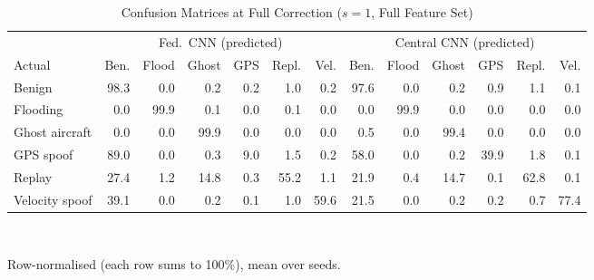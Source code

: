\begin{table}[t]
\centering
\scriptsize
\caption{Confusion Matrices at Full Correction ($s=1$, Full Feature Set)}
\label{tab:confusion}
\setlength{\tabcolsep}{2.5pt}
\begin{tabular}{lrrrrrrrrrrrr}
\toprule
& \multicolumn{6}{c}{Fed.\ CNN (predicted)} & \multicolumn{6}{c}{Central CNN (predicted)} \\
\cmidrule(lr){2-7}\cmidrule(lr){8-13}
Actual & Ben. & Flood & Ghost & GPS & Repl. & Vel. & Ben. & Flood & Ghost & GPS & Repl. & Vel. \\
\midrule
Benign & 98.3 & 0.0 & 0.2 & 0.2 & 1.0 & 0.2 & 97.6 & 0.0 & 0.2 & 0.9 & 1.1 & 0.1 \\
Flooding & 0.0 & 99.9 & 0.1 & 0.0 & 0.1 & 0.0 & 0.0 & 99.9 & 0.0 & 0.0 & 0.0 & 0.0 \\
Ghost aircraft & 0.0 & 0.0 & 99.9 & 0.0 & 0.0 & 0.0 & 0.5 & 0.0 & 99.4 & 0.0 & 0.0 & 0.0 \\
GPS spoof & 89.0 & 0.0 & 0.3 & 9.0 & 1.5 & 0.2 & 58.0 & 0.0 & 0.2 & 39.9 & 1.8 & 0.1 \\
Replay & 27.4 & 1.2 & 14.8 & 0.3 & 55.2 & 1.1 & 21.9 & 0.4 & 14.7 & 0.1 & 62.8 & 0.1 \\
Velocity spoof & 39.1 & 0.0 & 0.2 & 0.1 & 1.0 & 59.6 & 21.5 & 0.0 & 0.2 & 0.2 & 0.7 & 77.4 \\
\bottomrule
\end{tabular}
\\[2pt]
\parbox{\linewidth}{\scriptsize Row-normalised (each row sums to 100\%), mean over  seeds.}
\end{table}
